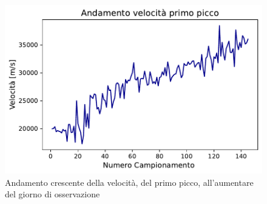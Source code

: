 \begin{figure}[H]
	\centering
	\includegraphics[scale=0.8]{Prima_NO.pdf}
	\caption{Andamento crescente della velocità, del primo picco, all'aumentare del giorno di osservazione}
    	\label{fig:Prima_NO}
\end{figure}


